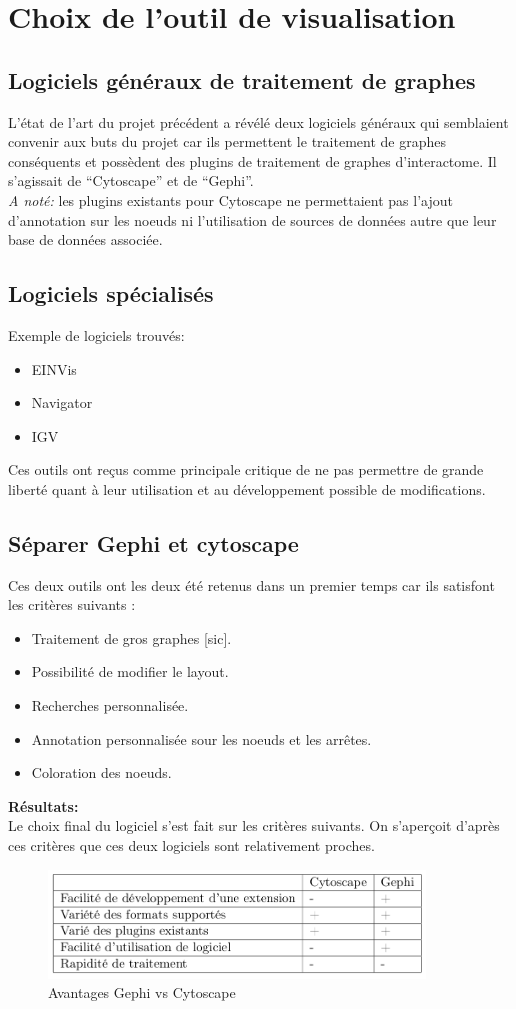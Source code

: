 \documentclass{article}
\begin{document}
\section{Choix de l'outil de visualisation}
\cite{Sisto:2015}
\subsection{Logiciels généraux de traitement de graphes}
L'état de l'art du projet précédent a révélé deux logiciels généraux qui semblaient convenir aux buts du projet car ils permettent le traitement de graphes conséquents et possèdent des plugins de traitement de graphes d'interactome. Il s'agissait de ``Cytoscape'' et de ``Gephi''. \\
\textit{A noté:} les plugins existants pour Cytoscape ne permettaient pas l'ajout d'annotation
sur les noeuds ni l'utilisation de sources de données autre que leur base de données
associée.
\subsection{Logiciels spécialisés}
Exemple de logiciels trouvés:
\begin{itemize}
  \item EINVis
  \item Navigator
  \item IGV
\end{itemize}
Ces outils ont reçus comme principale critique de ne pas permettre de grande liberté
quant à leur utilisation et au développement possible de modifications.
\subsection{Séparer Gephi et cytoscape}
Ces deux outils ont les deux été retenus dans un premier temps car ils satisfont les critères suivants :
\begin{itemize}
  \item Traitement de gros graphes [sic].
  \item Possibilité de modifier le layout.
  \item Recherches personnalisée.
  \item Annotation personnalisée sour les noeuds et les arrêtes.
  \item Coloration des noeuds.
\end{itemize}
\textbf{Résultats:}\\
Le choix final du logiciel s'est fait sur les critères suivants. On s'aperçoit d'après
ces critères que ces deux logiciels sont relativement proches.
\begin{figure}[!h]
  \center
  \includegraphics[width=10cm]{gephi_vs.png}
  \caption{Avantages Gephi vs Cytoscape}
\end{figure}
\end{document}
